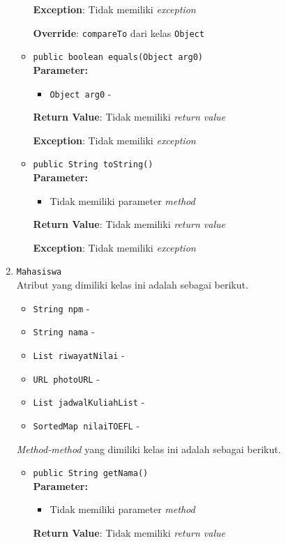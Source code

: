 \documentclass{article}
\begin{document}
\begin{enumerate}
\begin{itemize}
\textbf{Exception}: Tidak memiliki \textit{exception}

\textbf{Override}: \texttt{compareTo} dari kelas \texttt{Object}

\item \texttt{public boolean equals(Object arg0)}\\ 


\textbf{Parameter:}\begin{itemize}
\item \texttt{Object arg0} - 
\end{itemize}
\textbf{Return Value}: Tidak memiliki \textit{return value}

\textbf{Exception}: Tidak memiliki \textit{exception}

\item \texttt{public String toString()}\\ 


\textbf{Parameter:}\begin{itemize}
\item Tidak memiliki parameter \textit{method}
\end{itemize}
\textbf{Return Value}: Tidak memiliki \textit{return value}

\textbf{Exception}: Tidak memiliki \textit{exception}

\end{itemize}
\item \texttt{Mahasiswa}\\ 


Atribut yang dimiliki kelas ini adalah sebagai berikut.
\begin{itemize}
\item \texttt{String npm} - 
\item \texttt{String nama} - 
\item \texttt{List riwayatNilai} - 
\item \texttt{URL photoURL} - 
\item \texttt{List jadwalKuliahList} - 
\item \texttt{SortedMap nilaiTOEFL} - 
\end{itemize}
\textit{Method-method} yang dimiliki kelas ini adalah sebagai berikut.
\begin{itemize}
\item \texttt{public String getNama()}\\ 


\textbf{Parameter:}\begin{itemize}
\item Tidak memiliki parameter \textit{method}
\end{itemize}
\textbf{Return Value}: Tidak memiliki \textit{return value}


\end{itemize}
\end{enumerate}
\end{document}

